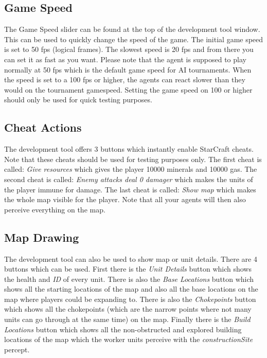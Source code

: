 \subsection{Game Speed}
The Game Speed slider can be found at the top of the development tool window. This can be used to quickly change the speed of the game. The initial game speed is set to 50 fps (logical frames). The slowest speed is 20 fps and from there you can set it as fast as you want. Please note that the agent is supposed to play normally at 50 fps which is the default game speed for AI tournaments. When the speed is set to a 100 fps or higher, the agents can react slower than they would on the tournament gamespeed. Setting the game speed on 100 or higher should only be used for quick testing purposes.

\subsection{Cheat Actions}
The development tool offers 3 buttons which instantly enable StarCraft cheats. Note that these cheats should be used for testing purposes only. The first cheat is called: \textit{Give resources} which gives the player 10000 minerals and 10000 gas. The second cheat is called: \textit{Enemy attacks deal 0 damager} which makes the units of the player immune for damage. The last cheat is called: \textit{Show map} which makes the whole map visible for the player. Note that  all your agents will then also perceive everything on the map.

\subsection{Map Drawing}
The development tool can also be used to show map or unit details. There are 4 buttons which can be used. First there is the \textit{Unit Details} button which shows the health and \textit{ID} of every unit. There is also the \textit{Base Locations} button which shows all the starting locations of the map and also all the base locations on the map where players could be expanding to. There is also the \textit{Chokepoints} button which shows all the chokepoints (which are the narrow points where not many units can go through at the same time) on the map. Finally there is the \textit{Build Locations} button which shows all the non-obstructed and explored building locations of the map which the worker units perceive with the \textit{constructionSite} percept.
